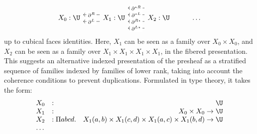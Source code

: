 \documentclass{msc}
\newcommand{\kstar}{{\star}}
\begin{document}
\begin{equation*}
  \begin{tikzcd}
    X_0: \U & X_1: \U \arrow[l, "\partial^L" description, shift left=2] \arrow[l, "\partial^R" description, shift right=2] & X_2: \U \arrow[l, "\partial^{L\kstar}" description, shift left=6] \arrow[l, "\partial^{R\kstar}" description, shift left=2] \arrow[l, "\partial^{\kstar L}" description, shift right=2] \arrow[l, "\partial^{\kstar R}" description, shift right=6] & \ldots
  \end{tikzcd}
\end{equation*}
up to cubical faces identities. Here, $X_1$ can be seen as a family over $X_0 \times X_0$, and $X_2$ can be seen as a family over $X_1 \times X_1 \times X_1 \times X_1$, in the fibered presentation. This suggests an alternative indexed presentation of the presheaf as a stratified sequence of families indexed by families of lower rank, taking into account the coherence conditions to prevent duplications. Formulated in type theory, it takes the form:
\begin{equation*}
  \begin{array}{llr}
    X_0 & :              & \U                                                                            \\
    X_1 & :              & X_0 \times X_0 \rightarrow  \U                                                 \\
    X_2 & : \Pi a b c d. & X_1(a,b) \times X_1 (c,d) \times X_1(a,c) \times X_1 (b,d) \rightarrow \U \\
    \ldots
  \end{array}
\end{equation*}
\end{document}
